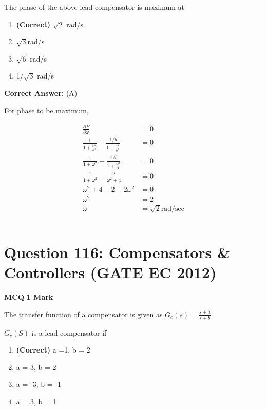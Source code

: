 \documentclass[11pt,a4paper]{article}
\begin{document}
The phase of the above lead compensator is maximum at


\begin{enumerate}[label=(\Alph*)]
    \item \textbf{(Correct)} $\sqrt{2}$ rad/s
    \item $\sqrt{3}$rad/s
    \item $\sqrt{6}$ rad/s
    \item 1/$\sqrt{3}$ rad/s
\end{enumerate}

\noindent \textbf{Correct Answer:} (A)

\begin{tcolorbox}[solbox, title=Detailed Solution -- Question 115]
For phase to be maximum,

\[
\begin{aligned} \frac{\partial P}{\partial \omega}&=0 \\ \frac{1}{1+\frac{\omega^{2}}{a^{2}}}- \frac{1/b}{1+\frac{\omega^{2}}{b^{2}}}&=0 \\ \frac{1}{1+\omega^{2}}- \frac{1/b}{1+\frac{\omega^{2}}{4}}&=0\\ \frac{1}{1+\omega^{2}}-\frac{2}{\omega^{2}+4} &=0 \\ \omega^{2}+4-2-2 \omega^{2} &=0 \\ \omega^{2} &=2 \\ \omega &=\sqrt{2} \mathrm{rad} / \mathrm{sec} \end{aligned}
\]
\end{tcolorbox}

\vspace{1.5em}
\hrule
\vspace{1.5em}

\section*{Question 116: Compensators \& Controllers (GATE EC 2012)}
\noindent \textbf{\color{primary}MCQ} \hfill \textbf{\color{secondary}1 Mark}


\noindent The transfer function of a compensator is given as 
$G_{c}(s)=\frac{s+a}{s+b}$

$G_{c}(S)$ is a lead compensator if


\begin{enumerate}[label=(\Alph*)]
    \item \textbf{(Correct)} a =1, b = 2
    \item a = 3, b = 2
    \item a = -3, b = -1
    \item a = 3, b = 1
\end{enumerate}
\end{document}

